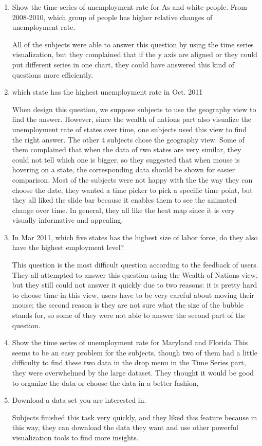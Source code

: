 \documentclass{sigchi}
\begin{document}
\begin{enumerate}
\item    Show the time series of unemployment rate for As and white people. From 2008-2010, which group of people has higher relative changes of unemployment rate.


All of the subjects were able to answer this question by using the time series visualization, but they complained that if the y axis are aligned or they could put different series in one chart, they could have answered this kind of questions more efficiently.

\item    which state has the highest unemployment rate in Oct. 2011


When design this question, we suppose subjects to use the geography view to find the answer. However, since the wealth of nations part also visualize the unemployment rate of states over time, one subjects used this view to find the right answer. The other 4 subjects chose the geography view. Some of them complained that when the data of two states are very similar, they could not tell which one is bigger, so they suggested that when mouse is hovering on a state, the corresponding data should be shown for easier comparison. Most of the subjects were not happy with the the way they can choose the date, they wanted a time picker to pick a specific time point, but they all liked the slide bar because it enables them to see the animated change over time. In general, they all like the heat map since it is very visually informative and appealing.


\item    In Mar 2011, which five states has the highest size of labor force, do they also have the highest employment level?

This question is the most difficult question according to the feedback of users. They all attempted to answer this question using the Wealth of Nations view, but they still could not answer it quickly due to two reasons: it is pretty hard to choose time in this view, users have to be very careful about moving their mouse; the second reason is they are not sure what the size of the bubble stands for, so some of they were not able to answer the second part of the question.


\item     Show the time series of unemployment rate for Maryland and Florida
This seems to be an easy problem for the subjects, though two of them had a little difficulty to find these two data in the drop menu in the Time Series part, they were overwhelmed by the large dataset. They thought it would be good to organize the data or choose the data in a better fashion,

\item     Download a data set you are interested in.

Subjects finished this task very quickly, and they liked this feature because in this way, they can download the data they want and use other powerful visualization tools to find more insights.

\end{enumerate}
\end{document}
